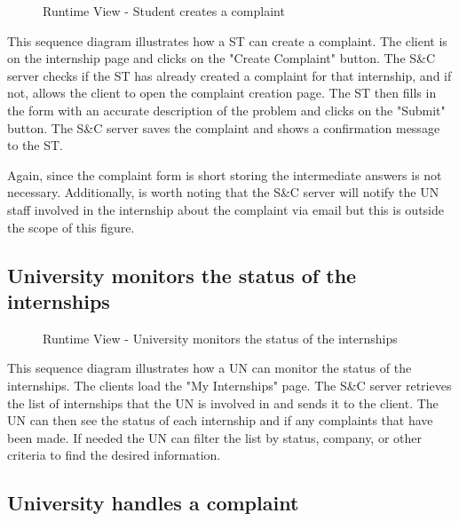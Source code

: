 \begin{figure}[H]
      \centering
      \caption{Runtime View - Student creates a complaint}
      \label{fig:rv-st-creates-complaint}
\end{figure}

\par This sequence diagram illustrates how a ST can create a complaint. The client is on the internship page and clicks 
on the "Create Complaint" button. The S\&C server checks if the ST has already created a complaint for that internship, 
and if not, allows the client to open the complaint creation page. The ST then fills in the form with an accurate 
description of the problem and clicks on the "Submit" button. The S\&C server saves the complaint and shows a 
confirmation message to the ST.

\par Again, since the complaint form is short storing the intermediate answers is not necessary. Additionally, is worth 
noting that the S\&C server will notify the UN staff involved in the internship about the complaint via email but this 
is outside the scope of this figure.

\subsection{University monitors the status of the internships}
\label{sub:university-monitors-the-status-of-the-internships}%

\begin{figure}[H]
      \centering
      \caption{Runtime View - University monitors the status of the internships}
      \label{fig:rv-un-monitors-internships}
\end{figure}

\par This sequence diagram illustrates how a UN can monitor the status of the internships. The clients load the "My 
Internships" page. The S\&C server retrieves the list of internships that the UN is involved in and sends it to the 
client. The UN can then see the status of each internship and if any complaints that have been made. If needed the UN 
can filter the list by status, company, or other criteria to find the desired information.

\subsection{University handles a complaint}
\label{sub:university-handles-a-complaint}%

